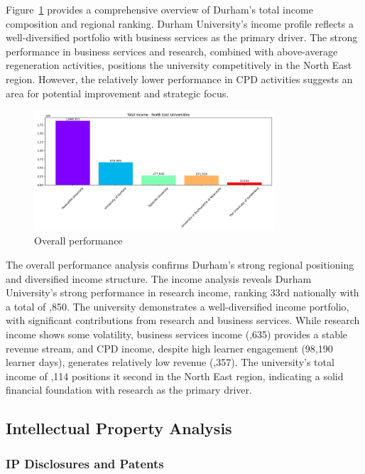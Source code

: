 \documentclass[journal,onecolumn, 10pt,draftclsnofoot]{IEEEtran}
\begin{document}
Figure~\ref{fig:overall-performance} provides a comprehensive overview of Durham's total income composition and regional ranking. Durham University's income profile reflects a well-diversified portfolio with business services as the primary driver. The strong performance in business services and research, combined with above-average regeneration activities, positions the university competitively in the North East region. However, the relatively lower performance in CPD activities suggests an area for potential improvement and strategic focus.

\begin{figure}[h]
\centering
\includegraphics[width=0.8\textwidth]{Fig/figure17._overall_performance.png}
\caption{Overall performance}
\label{fig:overall-performance}
\end{figure}

The overall performance analysis confirms Durham's strong regional positioning and diversified income structure. The income analysis reveals Durham University's strong performance in research income, ranking 33rd nationally with a total of ,850. The university demonstrates a well-diversified income portfolio, with significant contributions from research and business services. While research income shows some volatility, business services income (,635) provides a stable revenue stream, and CPD income, despite high learner engagement (98,190 learner days), generates relatively low revenue (,357). The university's total income of ,114 positions it second in the North East region, indicating a solid financial foundation with research as the primary driver.

\subsection{Intellectual Property Analysis}
\label{sec:ip-analysis}

\subsubsection{IP Disclosures and Patents}
\end{document}
